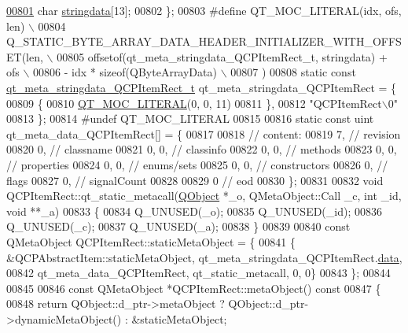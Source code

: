 \begin{DoxyCode}
\hypertarget{a00067_source_l00801}{}\hyperlink{a00067_a8006d9df79f24f9dc9846ce4485c145a}{00801}     \textcolor{keywordtype}{char} \hyperlink{a00067_a8006d9df79f24f9dc9846ce4485c145a}{stringdata}[13];
00802 \};
00803 \textcolor{preprocessor}{#define QT\_MOC\_LITERAL(idx, ofs, len) \(\backslash\)}
00804 \textcolor{preprocessor}{    Q\_STATIC\_BYTE\_ARRAY\_DATA\_HEADER\_INITIALIZER\_WITH\_OFFSET(len, \(\backslash\)}
00805 \textcolor{preprocessor}{    offsetof(qt\_meta\_stringdata\_QCPItemRect\_t, stringdata) + ofs \(\backslash\)}
00806 \textcolor{preprocessor}{        - idx * sizeof(QByteArrayData) \(\backslash\)}
00807 \textcolor{preprocessor}{    )}
00808 \textcolor{keyword}{static} \textcolor{keyword}{const} \hyperlink{a00067_de/d79/a00203}{qt\_meta\_stringdata\_QCPItemRect\_t} 
      qt\_meta\_stringdata\_QCPItemRect = \{
00809     \{
00810 \hyperlink{a00067_a75bb9482d242cde0a06c9dbdc6b83abe}{QT\_MOC\_LITERAL}(0, 0, 11)
00811     \},
00812     \textcolor{stringliteral}{"QCPItemRect\(\backslash\)0"}
00813 \};
00814 \textcolor{preprocessor}{#undef QT\_MOC\_LITERAL}
00815 
00816 \textcolor{keyword}{static} \textcolor{keyword}{const} uint qt\_meta\_data\_QCPItemRect[] = \{
00817 
00818  \textcolor{comment}{// content:}
00819        7,       \textcolor{comment}{// revision}
00820        0,       \textcolor{comment}{// classname}
00821        0,    0, \textcolor{comment}{// classinfo}
00822        0,    0, \textcolor{comment}{// methods}
00823        0,    0, \textcolor{comment}{// properties}
00824        0,    0, \textcolor{comment}{// enums/sets}
00825        0,    0, \textcolor{comment}{// constructors}
00826        0,       \textcolor{comment}{// flags}
00827        0,       \textcolor{comment}{// signalCount}
00828 
00829        0        \textcolor{comment}{// eod}
00830 \};
00831 
00832 \textcolor{keywordtype}{void} QCPItemRect::qt\_static\_metacall(\hyperlink{a00059}{QObject} *\_o, QMetaObject::Call \_c, \textcolor{keywordtype}{int} \_id, \textcolor{keywordtype}{void} **\_a)
00833 \{
00834     Q\_UNUSED(\_o);
00835     Q\_UNUSED(\_id);
00836     Q\_UNUSED(\_c);
00837     Q\_UNUSED(\_a);
00838 \}
00839 
00840 \textcolor{keyword}{const} QMetaObject QCPItemRect::staticMetaObject = \{
00841     \{ &QCPAbstractItem::staticMetaObject, qt\_meta\_stringdata\_QCPItemRect.\hyperlink{a00067_abb87c72758ddd18aa3c36a7ee960fa1f}{data},
00842       qt\_meta\_data\_QCPItemRect,  qt\_static\_metacall, 0, 0\}
00843 \};
00844 
00845 
00846 \textcolor{keyword}{const} QMetaObject *QCPItemRect::metaObject()\textcolor{keyword}{ const}
00847 \textcolor{keyword}{}\{
00848     \textcolor{keywordflow}{return} QObject::d\_ptr->metaObject ? QObject::d\_ptr->dynamicMetaObject() : &staticMetaObject;

\end{DoxyCode}
